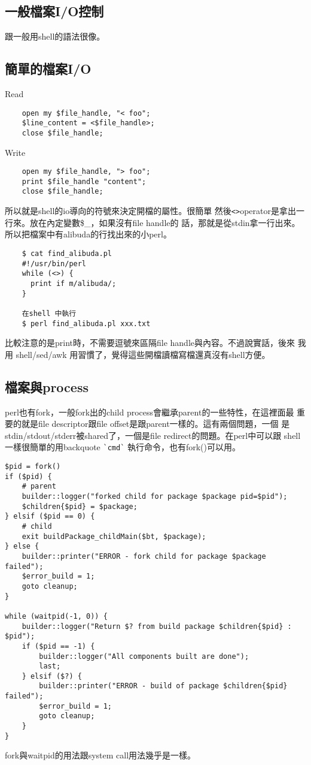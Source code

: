     \subsection{一般檔案I/O控制}
    跟一般用shell的語法很像。
    \subsection{簡單的檔案I/O}
    Read
    \begin{verbatim}
    open my $file_handle, "< foo";
    $line_content = <$file_handle>;
    close $file_handle;
    \end{verbatim}
    Write
    \begin{verbatim}
    open my $file_handle, "> foo";
    print $file_handle "content";
    close $file_handle;
    \end{verbatim}
    所以就是shell的io導向的符號來決定開檔的屬性。很簡單
    然後\verb=<>=operator是拿出一行來。放在內定變數\$\_，如果沒有file handle的
    話，那就是從stdin拿一行出來。所以把檔案中有alibuda的行找出來的小perl。
    \begin{verbatim}
    $ cat find_alibuda.pl
    #!/usr/bin/perl
    while (<>) {
      print if m/alibuda/;
    }

    在shell 中執行
    $ perl find_alibuda.pl xxx.txt
    \end{verbatim}
    比較注意的是print時，不需要逗號來區隔file handle與內容。不過說實話，後來
    我用 shell/sed/awk 用習慣了，覺得這些開檔讀檔寫檔還真沒有shell方便。

      \subsection{檔案與process}
      perl也有fork，一般fork出的child process會繼承parent的一些特性，在這裡面最
      重要的就是file descriptor跟file offset是跟parent一樣的。這有兩個問題，一個
      是stdin/stdout/stderr被shared了，一個是file redirect的問題。在perl中可以跟
      shell 一樣很簡單的用backquote \verb=`cmd`= 執行命令，也有fork()可以用。
      \begin{verbatim}
$pid = fork()
if ($pid) {
    # parent
    builder::logger("forked child for package $package pid=$pid");
    $children{$pid} = $package;
} elsif ($pid == 0) {
    # child
    exit buildPackage_childMain($bt, $package);
} else {
    builder::printer("ERROR - fork child for package $package failed");
    $error_build = 1;
    goto cleanup;
}

while (waitpid(-1, 0)) {
    builder::logger("Return $? from build package $children{$pid} : $pid");
    if ($pid == -1) {
        builder::logger("All components built are done");
        last;
    } elsif ($?) {
        builder::printer("ERROR - build of package $children{$pid} failed");
        $error_build = 1;
        goto cleanup;
    }
}
      \end{verbatim}
      fork與waitpid的用法跟system call用法幾乎是一樣。


